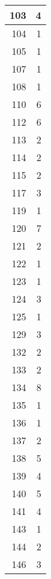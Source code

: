 \begin{tabular}{|r|r|}
\hline
103&4\\
\hline
104&1\\
\hline
105&1\\
\hline
107&1\\
\hline
108&1\\
\hline
110&6\\
\hline
112&6\\
\hline
113&2\\
\hline
114&2\\
\hline
115&2\\
\hline
117&3\\
\hline
119&1\\
\hline
120&7\\
\hline
121&2\\
\hline
122&1\\
\hline
123&1\\
\hline
124&3\\
\hline
125&1\\
\hline
129&3\\
\hline
132&2\\
\hline
133&2\\
\hline
134&8\\
\hline
135&1\\
\hline
136&1\\
\hline
137&2\\
\hline
138&5\\
\hline
139&4\\
\hline
140&5\\
\hline
141&4\\
\hline
143&1\\
\hline
144&2\\
\hline
146&3\\
\hline
\end{tabular}
